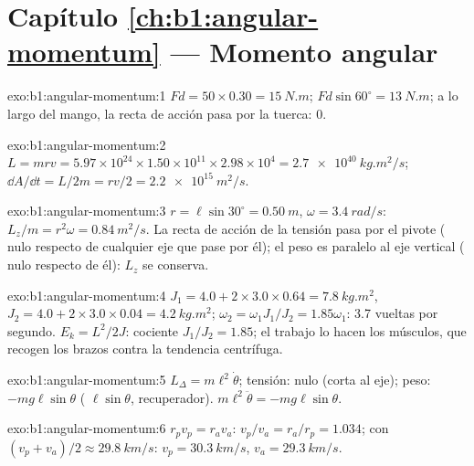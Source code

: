 \section*{Capítulo \ref{ch:b1:angular-momentum} --- Momento angular}

\begin{solution}{exo:b1:angular-momentum:1}
$Fd = 50 \times 0.30 = \qty{15}{N.m}$; $Fd\sin 60^\circ = \qty{13}{N.m}$;
a lo largo del mango, la recta de acción pasa por la tuerca: $0$.
\end{solution}

\begin{solution}{exo:b1:angular-momentum:2}
$L = mrv = 5.97\times10^{24} \times 1.50\times10^{11} \times 2.98\times10^4 =
\qty{2.7e40}{kg.m^2/s}$; $\dd A/\dd t = L/2m = rv/2 = \qty{2.2e15}{m^2/s}$.
\end{solution}

\begin{solution}{exo:b1:angular-momentum:3}
$r = \ell\sin 30^\circ = \qty{0.50}{m}$, $\omega = \qty{3.4}{rad/s}$:
$L_z/m = r^2\omega = \qty{0.84}{m^2/s}$. La recta de acción de la tensión
pasa por el pivote ( nulo respecto de cualquier eje que pase por
él); el peso es paralelo al eje vertical ( nulo respecto de él):
$L_z$ se conserva.
\end{solution}

\begin{solution}{exo:b1:angular-momentum:4}
$J_1 = 4.0 + 2 \times 3.0 \times 0.64 = \qty{7.8}{kg.m^2}$, $J_2 = 4.0 +
2 \times 3.0 \times 0.04 = \qty{4.2}{kg.m^2}$; $\omega_2 = \omega_1J_1/J_2 =
1.85\omega_1$: \qty{3.7}{} vueltas por segundo. $E_k = L^2/2J$: cociente
$J_1/J_2 = 1.85$; el trabajo lo hacen los músculos, que recogen los brazos
contra la tendencia centrífuga.
\end{solution}

\begin{solution}{exo:b1:angular-momentum:5}
$L_\Delta = m\ell^2\dot\theta$; tensión:  nulo (corta al eje);
peso: $-mg\ell\sin\theta$ ( $\ell\sin\theta$, recuperador).
$m\ell^2\ddot\theta = -mg\ell\sin\theta$.
\end{solution}

\begin{solution}{exo:b1:angular-momentum:6}
$r_pv_p = r_av_a$: $v_p/v_a = r_a/r_p = 1.034$; con $(v_p + v_a)/2 \approx
\qty{29.8}{km/s}$: $v_p = \qty{30.3}{km/s}$, $v_a = \qty{29.3}{km/s}$.
\end{solution}

